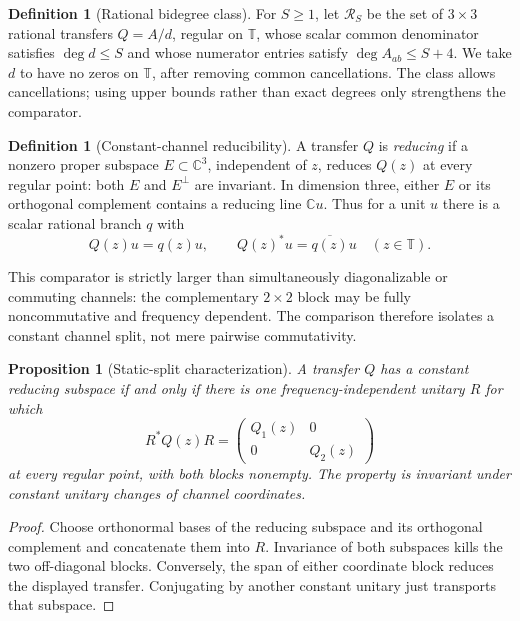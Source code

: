 \documentclass[11pt]{article}
\newtheorem{proposition}[theorem]{Proposition}
\theoremstyle{definition}
\newtheorem{definition}[theorem]{Definition}
\theoremstyle{remark}
\newcommand{\C}{\mathbb{C}}
\newcommand{\T}{\mathbb{T}}
\newcommand{\cR}{\mathcal{R}}
\begin{document}
\begin{definition}[Rational bidegree class]
For $S\geq1$, let $\cR_S$ be the set of $3\times3$ rational transfers
$Q=A/d$, regular on $\T$, whose scalar common denominator satisfies
$\deg d\leq S$ and whose numerator entries satisfy $\deg A_{ab}\leq S+4$.
We take $d$ to have no zeros on $\T$, after removing common cancellations.
The class allows cancellations; using upper bounds rather than exact degrees
only strengthens the comparator.
\end{definition}

\begin{definition}[Constant-channel reducibility]
A transfer $Q$ is \emph{reducing} if a nonzero proper subspace
$E\subset\C^3$, independent of $z$, reduces $Q(z)$ at every regular point:
both $E$ and $E^\perp$ are invariant.  In dimension three, either $E$ or its
orthogonal complement contains a reducing line $\C u$.  Thus for a unit $u$
there is a scalar rational branch $q$ with
\[
 Q(z)u=q(z)u,\qquad Q(z)^*u=\overline{q(z)}u
 \quad(z\in\T).
\]
\end{definition}

This comparator is strictly larger than simultaneously diagonalizable or
commuting channels: the complementary $2\times2$ block may be fully
noncommutative and frequency dependent.  The comparison therefore isolates a
constant channel split, not mere pairwise commutativity.

\begin{proposition}[Static-split characterization]\label{prop:staticsplit}
A transfer $Q$ has a constant reducing subspace if and only if there is one
frequency-independent unitary $R$ for which
\[
 R^*Q(z)R=\begin{pmatrix}Q_1(z)&0\\0&Q_2(z)\end{pmatrix}
\]
at every regular point, with both blocks nonempty.  The property is invariant
under constant unitary changes of channel coordinates.
\end{proposition}

\begin{proof}
Choose orthonormal bases of the reducing subspace and its orthogonal
complement and concatenate them into $R$.  Invariance of both subspaces kills
the two off-diagonal blocks.  Conversely, the span of either coordinate block
reduces the displayed transfer.  Conjugating by another constant unitary just
transports that subspace.
\end{proof}
\end{document}
